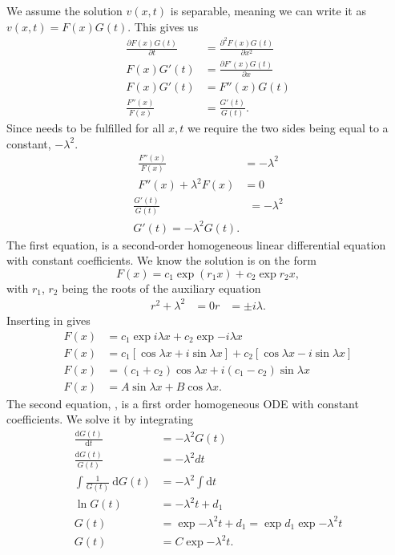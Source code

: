 We assume the solution $v(x,t)$ is separable, meaning we can write it as
$v(x,t) = F(x)G(t)$.
This gives us
%
\begin{align}
	\frac{\partial F(x)G(t)}{\partial t} &= \frac{\partial^2 F(x)G(t)}{\partial
	x^2} \\
	F(x)G'(t) &= \frac{\partial F'(x)G(t)}{\partial x} \\
	F(x)G'(t) &= F''(x)G(t) \\
	\frac{F''(x)}{F(x)} &= \frac{G'(t)}{G(t)}.
	\label{eq:separate}
\end{align}
%
Since  needs to be fulfilled for all $x,t$ we require the two
sides being equal to a constant, $-\lambda^2$.
%
\begin{align*}
	\frac{F''(x)}{F(x)} &= -\lambda^2 \\
	F''(x) + \lambda^2F(x) &= 0
	\label{eq:sepF}
\end{align*}
%
\begin{align*}
	\frac{G'(t)}{G(t)} &= -\lambda^2 \\
	G'(t) = -\lambda^2G(t).
	\label{eq:sepG}
\end{align*}
%
The first equation,  is a second-order homogeneous linear
differential equation with constant coefficients. We know the solution is on the
form
%
\begin{equation*}
	F(x) = c_1\exp(r_1x) + c_2\exp{r_2x},
	\label{eq:F}
\end{equation*}
%
with $r_1$, $r_2$ being the roots of the auxiliary equation
%
\begin{align*}
	r^2 + \lambda^2 &= 0
	r &= \pm i\lambda.
	\label{eq:roots}
\end{align*}
%
Inserting  in  gives
%
\begin{align*}
	F(x) &= c_1\exp{i\lambda x} + c_2\exp{-i\lambda x} \\
	F(x) &= c_1\left[ \cos{\lambda x} + i\sin{\lambda x} \right] + c_2\left[
	\cos{\lambda x} - i\sin{\lambda x} \right] \\
	F(x) &= (c_1 + c_2)\cos{\lambda x} + i(c_1 - c_2)\sin{\lambda x} \\
	F(x) &= A\sin{\lambda x} + B\cos{\lambda x}.
\end{align*}
%
The second equation, , is a first order homogeneous ODE with
constant coefficients. We solve it by integrating
%
\begin{align*}
	\frac{\mathrm{d}G(t)}{\mathrm{d}t} &= -\lambda^2 G(t) \\
	\frac{\mathrm{d}G(t)}{G(t)} &= - \lambda^2 dt \\
	\int \frac{1}{G(t)} \ \mathrm{d}G(t) &= -\lambda^2 \int \mathrm{d}t \\
	\ln{G(t)} &= -\lambda^2 t + d_1 \\
	G(t) &= \exp{-\lambda^2 t + d_1} = \exp{d_1}\exp{-\lambda^2 t} \\
	G(t) &= C\exp{-\lambda^2 t}.
\end{align*}
